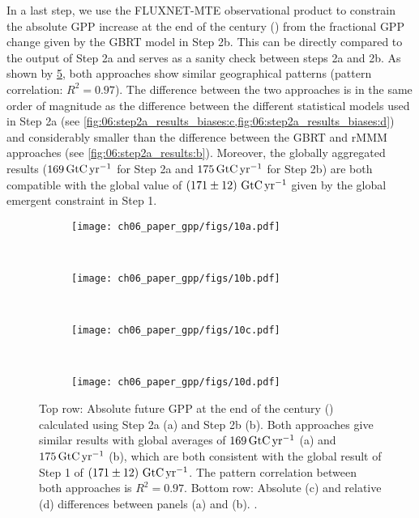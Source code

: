 In a last step, we use the FLUXNET-MTE observational product to constrain the
absolute \ac{GPP} increase at the end of the  century
() from the fractional \ac{GPP} change given by the \ac{GBRT}
model in Step 2b. This can be directly compared to the output of Step 2a and
serves as a sanity check between steps 2a and 2b. As shown by
\cref{fig:06:comparison_step2a_step2b}, both approaches show similar
geographical patterns (pattern correlation: $R^2 = 0.97$). The difference
between the two approaches is in the same order of magnitude as the difference
between the different statistical models used in Step 2a (see
\cref{fig:06:step2a_results_biases:c,fig:06:step2a_results_biases:d}) and
considerably smaller than the difference between the \ac{GBRT} and r\acs{MMM}
approaches (see \cref{fig:06:step2a_results:b}). Moreover, the globally
aggregated results ($169 \unit{\GtCyr{}}$ for Step 2a and $175 \unit{\GtCyr{}}$
for Step 2b) are both compatible with the global value of
$\pmrangeunit{171}{12}{\GtCyr{}}$ given by the global emergent constraint in
Step 1.

\begin{figure}[t]
  \centering
  \begin{subfigure}[b]{\SubfigureWidth{}}
    \texttt{[image: ch06\_paper\_gpp/figs/10a.pdf]}
    \caption{}
    \label{fig:06:comparison_step2a_step2b:a}
  \end{subfigure}
  ~
  \begin{subfigure}[b]{\SubfigureWidth{}}
    \texttt{[image: ch06\_paper\_gpp/figs/10b.pdf]}
    \caption{}
    \label{fig:06:comparison_step2a_step2b:b}
  \end{subfigure}
  \\
  \begin{subfigure}[b]{\SubfigureWidth{}}
    \texttt{[image: ch06\_paper\_gpp/figs/10c.pdf]}
    \caption{}
    \label{fig:06:comparison_step2a_step2b:c}
  \end{subfigure}
  ~
  \begin{subfigure}[b]{\SubfigureWidth{}}
    \texttt{[image: ch06\_paper\_gpp/figs/10d.pdf]}
    \caption{}
    \label{fig:06:comparison_step2a_step2b:d}
  \end{subfigure}
  \caption[
    Comparison of our two independent approaches from Step 2a and Step 2b.
  ]{
    Top row: Absolute future \acf{GPP} at the end of the  century
    () calculated using Step 2a (a) and Step 2b (b). Both
    approaches give similar results with global averages of $169
    \unit{\GtCyr{}}$ (a) and $175 \unit{\GtCyr{}}$ (b), which are both
    consistent with the global result of Step 1 of
    $\pmrangeunit{171}{12}{\GtCyr{}}$. The pattern correlation between both
    approaches is $R^2 = 0.97$. Bottom row: Absolute (c) and relative (d)
    differences between panels (a) and (b). .
  }
  \label{fig:06:comparison_step2a_step2b}
\end{figure}


